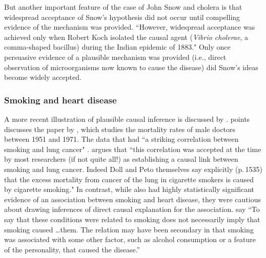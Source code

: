 \documentclass[11pt]{amsart}
\begin{document}
But another important feature of the case of John Snow and cholera is that widespread acceptance of Snow's hypothesis did not occur until compelling evidence of the mechanism was provided.
``However, widespread acceptance was achieved only when Robert Koch isolated the causal agent (\emph{Vibrio cholerae}, a comma-shaped bacillus) during the Indian epidemic of 1883." %
Only once persuasive evidence of a plausible mechanism was provided (i.e., direct observation of microorganisms now known to cause the disease) did Snow's ideas become widely accepted.

\subsubsection{Smoking and heart disease}
A more recent illustration of plausible causal inference is discussed by \citet{Gillies2011-GILTRT-3}.
 \citet{Gillies2011-GILTRT-3} points discusses the paper by \citet{Doll:1976aa}, which studies the mortality rates of male doctors between 1951 and 1971.
 The data that \citet{Doll:1976aa} had ``a striking correlation between smoking and lung cancer" \citep[p.\,111]{Gillies2011-GILTRT-3}.
 \citet{Gillies2011-GILTRT-3} argues that ``this correlation was accepted at the time by most researchers (if not quite all!) as establishing a causal link between smoking and lung cancer. Indeed Doll and Peto themselves say explicitly (p.\,1535) that the excess mortality from cancer of the lung in cigarette smokers is caused by cigarette smoking."
In contrast, while \citet{Doll:1976aa} also had highly statistically significant evidence of an association between smoking and heart disease, they were cautious about drawing inferences of direct causal explanation for the association.
\citet[p.\,1528]{Doll:1976aa} say ``To say that these conditions were related to smoking does not necessarily imply that smoking caused \dots them. The relation may have been secondary in that smoking was associated with some other factor, such as alcohol consumption or a feature of the personality, that caused the disease.''
 
\end{document}
